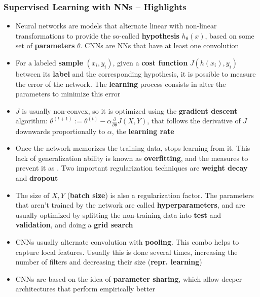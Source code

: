 \documentclass[hyperref={pdfpagelabels=false}]{beamer}
\begin{document}
     \begin{frame}[allowframebreaks]
       \frametitle{Supervised Learning with NNs -- Highlights}
       \begin{itemize}
       \item Neural networks are models that alternate linear with non-linear transformations  to provide the so-called \textbf{hypothesis} $h_\theta(x)$, based on some set of \textbf{parameters} $\theta$. CNNs are NNs that have at least one convolution
       \item For a labeled \textbf{sample} $(x_i, y_i)$, given a \textbf{cost function} $J(h(x_i), y_i)$ between its \textbf{label} and the corresponding hypothesis, it is possible to measure the error of the network. The \textbf{learning} process consists in alter the parameters to minimize this error
       \item $J$ is usually non-convex, so it is optimized using the \textbf{gradient descent} algorithm: $\theta^{(t+1)} := \theta^{(t)} - \alpha \frac{\partial}{\partial \theta} J(X, Y)$, that follows the derivative of $J$ downwards proportionally to $\alpha$, the \textbf{learning rate}
       \item Once the network memorizes the training data, stops learning from it. This lack of generalization ability is known as \textbf{overfitting}, and the measures to prevent it as . Two important regularization techniques are \textbf{weight decay} and \textbf{dropout}
       \item The size of $X, Y$ (\textbf{batch size}) is also a regularization factor. The parameters that aren't trained by the network are called \textbf{hyperparameters}, and are usually optimized by splitting the non-training data into \textbf{test} and \textbf{validation}, and doing a \textbf{grid search}
       \item CNNs usually alternate convolution with \textbf{pooling}. This combo helps to capture local features. Usually this is done several times, increasing the number of filters and decreasing their size (\textbf{repr. learning})
       \item CNNs are based on the idea of \textbf{parameter sharing}, which allow deeper architectures that perform empirically better\cite[p.202]{goodfellow}
       \end{itemize}
     \end{frame}



\end{document}
